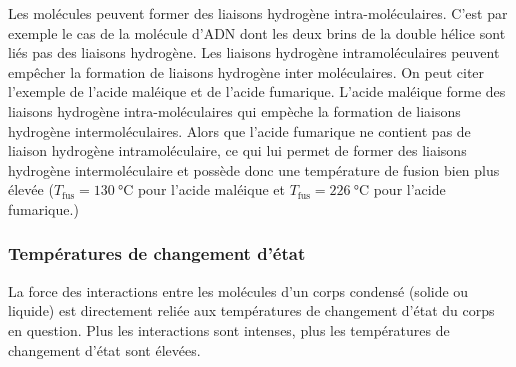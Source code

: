 \documentclass{cours}
\begin{document}
Les molécules peuvent former des liaisons hydrogène intra-moléculaires. C'est par exemple le cas de la molécule d'ADN dont les deux brins de la double hélice sont liés pas des liaisons hydrogène. Les liaisons hydrogène intramoléculaires peuvent empêcher la formation de liaisons hydrogène inter moléculaires. On peut citer l'exemple de l'acide maléique et de l'acide fumarique. L'acide maléique forme des liaisons hydrogène intra-moléculaires qui empèche la formation de liaisons hydrogène intermoléculaires. Alors que l'acide fumarique ne contient pas de liaison hydrogène intramoléculaire, ce qui lui permet de former des liaisons hydrogène intermoléculaire et possède donc une température de fusion bien plus élevée ($T_\text{fus} = \SI{130}{\celsius}$ pour l'acide maléique et $T_\text{fus}=\SI{226}{\celsius}$ pour l'acide fumarique.)
\begin{center}
\end{center}

\subsubsection{Températures de changement d'état}%

La force des interactions entre les molécules d'un corps condensé (solide ou liquide) est directement reliée aux températures de changement d'état du corps en question. Plus les interactions sont intenses, plus les températures de changement d'état sont élevées.
\end{document}
